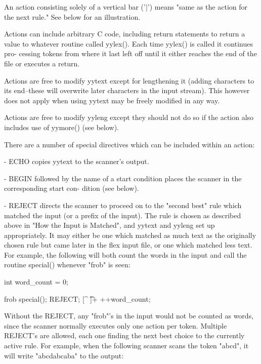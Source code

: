 \documentclass[12pt,spanish,twocolumn,lettersize]{article}
\begin{document}
       An action consisting solely of a vertical bar ('|')  means
       "same  as the action for the next rule."	 See below for an
       illustration.

       Actions can include arbitrary  C	 code,	including  return
       statements  to  return  a value to whatever routine called
       yylex().	 Each time yylex() is called  it  continues  pro-
       cessing tokens from where it last left off until it either
       reaches the end of the file or executes a return.

       Actions are free to modify yytext except	 for  lengthening
       it  (adding  characters	to  its end--these will overwrite
       later characters in the input stream).  This however  does
       not  apply  when	 using	%
       yytext may be freely modified in any way.

       Actions are free to modify yyleng except they  should  not
       do  so  if  the	action also includes use of yymore() (see
       below).

       There are a number of  special  directives  which  can  be
       included within an action:

       -      ECHO copies yytext to the scanner's output.

       -      BEGIN  followed  by  the	name of a start condition
	      places the scanner in the corresponding start  con-
	      dition (see below).

       -      REJECT  directs  the  scanner  to proceed on to the
	      "second best" rule which matched the  input  (or	a
	      prefix  of  the  input).	 The  rule  is	chosen as
	      described above in "How the Input is Matched",  and
	      yytext  and  yyleng  set	up appropriately.  It may
	      either be one which matched as  much  text  as  the
	      originally  chosen  rule but came later in the flex
	      input file, or one which matched	less  text.   For
	      example, the following will both count the words in
	      the input and call the routine  special()	 whenever
	      "frob" is seen:

			  int word_count = 0;

		  frob	      special(); REJECT;
		  [^ \t\n]+   ++word_count;

	      Without the REJECT, any "frob"'s in the input would
	      not be counted as words, since the scanner normally
	      executes	only  one  action  per	token.	 Multiple
	      REJECT's are allowed, each  one  finding	the  next
	      best  choice  to	the  currently	active rule.  For
	      example, when the following scanner scans the token
	      "abcd", it will write "abcdabcaba" to the output:
\end{document}
